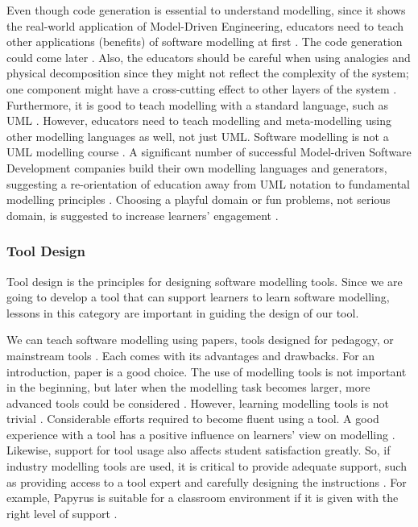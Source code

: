 \documentclass[12pt, a4paper]{report}
\begin{document}
{Even though code generation is essential to understand modelling, since it shows the real-world application of Model-Driven Engineering, educators need to teach other applications (benefits) of software modelling at first \cite{liebel2015ready}. The code generation could come later \cite{paige2014bad}. Also, the educators should be careful when using analogies and physical decomposition since they might not reflect the complexity of the system; one component might have a cross-cutting effect to other layers of the system \cite{paige2014bad}. Furthermore, it is good to teach modelling with a standard language, such as UML \cite{bezivin2009teaching}. However, educators need to teach modelling and meta-modelling using other modelling languages as well, not just UML. Software modelling is not a UML modelling course \cite{paige2014bad}. A significant number of successful Model-driven Software Development companies build their own modelling languages and generators, suggesting a re-orientation of education away from UML notation to fundamental modelling principles \cite{whittle2013industrial}. Choosing a playful domain or fun problems, not serious domain, is suggested to increase learners' engagement \cite{paige2014bad}.

\subsubsection{Tool Design}
Tool design is the principles for designing software modelling tools. Since we are going to develop a tool that can support learners to learn software modelling, lessons in this category are important in guiding the design of our tool. 

We can teach software modelling using papers, tools designed for pedagogy, or mainstream tools \cite{Akayama2013}. Each comes with its advantages and drawbacks. For an introduction, paper is a good choice. The use of modelling tools is not important in the beginning, but later when the modelling task becomes larger, more advanced tools could be considered \cite{bezivin2009teaching}. However, learning modelling tools is not trivial \cite{paige2014bad}. Considerable efforts required to become fluent using a tool. A good experience with a tool has a positive influence on learners' view on modelling \cite{liebel2015ready}. Likewise, support for tool usage also affects student satisfaction greatly. So, if industry modelling tools are used, it is critical to provide adequate support, such as providing access to a tool expert and carefully designing the instructions \cite{liebel2015ready}. For example, Papyrus is suitable for a classroom environment if it is given with the right level of support \cite{liebel2015ready}.

}
\end{document}
